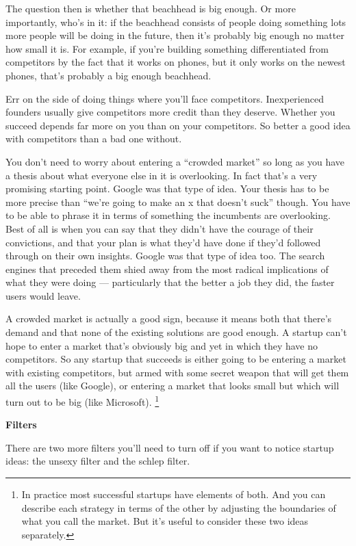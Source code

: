 The question then is whether that beachhead is big enough. Or more
importantly, who's in it: if the beachhead consists of people doing
something lots more people will be doing in the future, then it's
probably big enough no matter how small it is. For example, if you're
building something differentiated from competitors by the fact that it
works on phones, but it only works on the newest phones, that's probably
a big enough beachhead.

Err on the side of doing things where you'll face competitors.
Inexperienced founders usually give competitors more credit than they
deserve. Whether you succeed depends far more on you than on your
competitors. So better a good idea with competitors than a bad one
without.

You don't need to worry about entering a ``crowded market'' so long as
you have a thesis about what everyone else in it is overlooking. In fact
that's a very promising starting point. Google was that type of idea.
Your thesis has to be more precise than ``we're going to make an x that
doesn't suck'' though. You have to be able to phrase it in terms of
something the incumbents are overlooking. Best of all is when you can
say that they didn't have the courage of their convictions, and that
your plan is what they'd have done if they'd followed through on their
own insights. Google was that type of idea too. The search engines that
preceded them shied away from the most radical implications of what they
were doing --- particularly that the better a job they did, the faster
users would leave.

A crowded market is actually a good sign, because it means both that
there's demand and that none of the existing solutions are good enough.
A startup can't hope to enter a market that's obviously big and yet in
which they have no competitors. So any startup that succeeds is either
going to be entering a market with existing competitors, but armed with
some secret weapon that will get them all the users (like Google), or
entering a market that looks small but which will turn out to be big
(like Microsoft). \footnote{In practice most successful startups have elements of both. And
you can describe each strategy in terms of the other by adjusting the
boundaries of what you call the market. But it's useful to consider
these two ideas separately.}

\textbf{Filters}

There are two more filters you'll need to turn off if you want to notice
startup ideas: the unsexy filter and the schlep filter.

